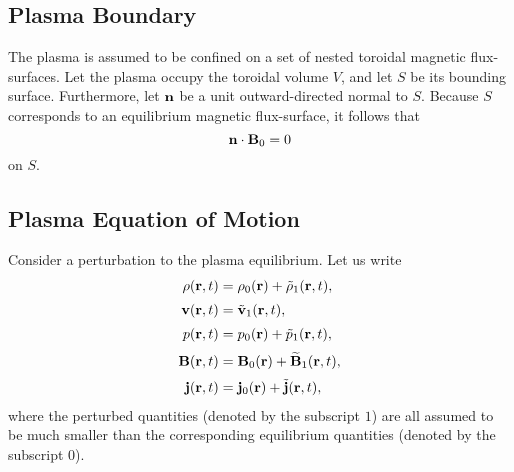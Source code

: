 \documentclass[12pt,prb,aps,notitlepage]{revtex4-1}
\begin{document}
\subsection{Plasma Boundary}
The plasma is assumed to be confined on a set of nested toroidal magnetic flux-surfaces. 
Let the plasma occupy the toroidal volume $V$, and let $S$ be its bounding surface. Furthermore, let ${\bf n}$ be
a unit outward-directed normal to $S$. Because $S$ corresponds to  an equilibrium  magnetic flux-surface, it follows that
\begin{equation}\label{e31x}
{\bf n}\cdot {\bf B}_0=0
\end{equation}
on $S$. 

\subsection{Plasma Equation of Motion}
Consider a perturbation to the plasma equilibrium. 
Let us write
\begin{align}
\rho({\bf r},t) &= \rho_0({\bf r})+ \tilde{\rho}_1({\bf r},t),\\[0.5ex]
{\bf v}({\bf r},t) &= \tilde{\bf v}_1({\bf r},t),\\[0.5ex]
p({\bf r},t) &= p_0({\bf r})+ \tilde{p}_1({\bf r},t),\\[0.5ex]
{\bf B}({\bf r},t) &= {\bf B}_0({\bf r})+ \widetilde{\bf B}_1({\bf r},t),\\[0.5ex]
{\bf j}({\bf r},t) &= {\bf j}_0({\bf r})+ \tilde{\bf j}({\bf r},t),
\end{align}
where the perturbed quantities (denoted by the subscript $1$) are all assumed to be much smaller than
the corresponding equilibrium quantities (denoted by the subscript $0$).
\end{document}
